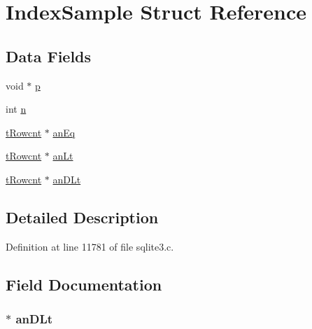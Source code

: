 \hypertarget{struct_index_sample}{}\section{Index\+Sample Struct Reference}
\label{struct_index_sample}
\subsection*{Data Fields}
\begin{DoxyCompactItemize}
\item 
void $\ast$ \hyperlink{struct_index_sample_a117104b82864d3b23ec174af6d392709}{p}
\item 
int \hyperlink{struct_index_sample_a76f11d9a0a47b94f72c2d0e77fb32240}{n}
\item 
\hyperlink{sqlite3_8c_a6de101211e945e499510b624a65c28a4}{t\+Rowcnt} $\ast$ \hyperlink{struct_index_sample_a5469081a172819424771bb89f5dc97e8}{an\+Eq}
\item 
\hyperlink{sqlite3_8c_a6de101211e945e499510b624a65c28a4}{t\+Rowcnt} $\ast$ \hyperlink{struct_index_sample_a7df8b6cba688742d6f5dc9579f8ec291}{an\+Lt}
\item 
\hyperlink{sqlite3_8c_a6de101211e945e499510b624a65c28a4}{t\+Rowcnt} $\ast$ \hyperlink{struct_index_sample_a0f509d3eb7d4f182e39273ce03e5e197}{an\+D\+Lt}
\end{DoxyCompactItemize}


\subsection{Detailed Description}


Definition at line 11781 of file sqlite3.\+c.



\subsection{Field Documentation}
\hypertarget{struct_index_sample_a0f509d3eb7d4f182e39273ce03e5e197}{}
\subsubsection[{an\+D\+Lt}]{$\ast$ an\+D\+Lt}\label{struct_index_sample_a0f509d3eb7d4f182e39273ce03e5e197}


